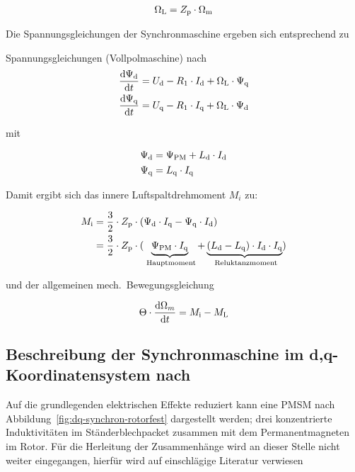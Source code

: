 \begin{align}
\Omega_{\mathrm{L}} = Z_{\mathrm{p}}\cdot\Omega_{\mathrm{m}}
\end{align}

Die Spannungsgleichungen der Synchronmaschine ergeben sich entsprechend zu

\begin{shaded}
Spannungsgleichungen (Vollpolmaschine) nach \textcite{schroder2000}
\begin{align}
\frac{\mathrm{d}\Psi_{\mathrm{d}}}{\mathrm{d}t} &= U_{\mathrm{d}} - R_{\mathrm{1}}\cdot I_{\mathrm{d}} + \Omega_{\mathrm{L}}\cdot\Psi_{\mathrm{q}} \\
\frac{\mathrm{d}\Psi_{\mathrm{q}}}{\mathrm{d}t} &= U_{\mathrm{q}} - R_{\mathrm{1}}\cdot I_{\mathrm{q}} + \Omega_{\mathrm{L}}\cdot\Psi_{\mathrm{d}}
\end{align}
\end{shaded}

mit 

\begin{align}
\Psi_{\mathrm{d}} &= \Psi_{\mathrm{PM}} + L_{\mathrm{d}}\cdot I_{\mathrm{d}}\\
\Psi_{\mathrm{q}} &= L_{\mathrm{q}}\cdot I_{\mathrm{q}}
\end{align}

Damit ergibt sich das innere Luftspaltdrehmoment $M_i$ zu:

\begin{align}
M_{\mathrm{i}} &= \frac{3}{2}\cdot Z_{\mathrm{p}} \cdot (\Psi_{\mathrm{d}}\cdot I_{\mathrm{q}} - \Psi_{\mathrm{q}}\cdot I_{\mathrm{d}}) \\ 
\nonumber &= \frac{3}{2}\cdot Z_{\mathrm{p}} \cdot (\underbrace{\Psi_{\mathrm{PM}}\cdot I_{\mathrm{q}}}_{\mathrm{\text{~Hauptmoment}}} + \underbrace{(L_{\mathrm{d}}-L_{\mathrm{q}})\cdot I_{\mathrm{d}}\cdot I_{\mathrm{q}}}_{\mathrm{\text{~Reluktanzmoment}}} )
\end{align}

und der allgemeinen mech.\ Bewegungsgleichung

\begin{align}
\Theta\cdot \frac{\mathrm{d}\Omega_m}{\mathrm{d}t} = M_{\mathrm{i}} - M_{\mathrm{L}}
\end{align}

\subsection{Beschreibung der Synchronmaschine im d,q-Koordinatensystem nach \textcite{kellner2012}}

Auf die grundlegenden elektrischen Effekte reduziert kann eine PMSM nach Abbildung~\ref{fig:dq-synchron-rotorfest} dargestellt werden; drei konzentrierte Induktivitäten im Ständerblechpacket zusammen mit dem Permanentmagneten im Rotor.
Für die Herleitung der Zusammenhänge wird an dieser Stelle nicht weiter eingegangen, hierfür wird auf einschlägige Literatur verwiesen \autocites{mullerI2005}{fischer2009}{schroder2000}{kremser2004}

